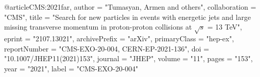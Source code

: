 @article{CMS:2021far,
    author = "Tumasyan, Armen and others",
    collaboration = "CMS",
    title = "{Search for new particles in events with energetic jets and large missing transverse momentum in proton-proton collisions at $ \sqrt{s} $ = 13 TeV}",
    eprint = "2107.13021",
    archivePrefix = "arXiv",
    primaryClass = "hep-ex",
    reportNumber = "CMS-EXO-20-004, CERN-EP-2021-136",
    doi = "10.1007/JHEP11(2021)153",
    journal = "JHEP",
    volume = "11",
    pages = "153",
    year = "2021",
    label = "CMS-EXO-20-004"
}

